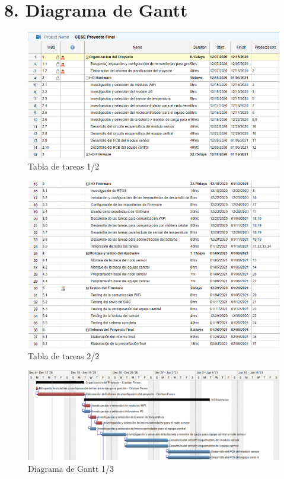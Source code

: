 \documentclass[11pt]{charter}
\begin{document}
\section{8. Diagrama de Gantt}
\label{sec:gantt}

\vspace{10px}

\begin{figure}[H]
\centering 
\includegraphics[width=.7\textwidth]{./Figuras/gantt-table1.png}
\caption{Tabla de tareas 1/2}
\label{fig:diagGantt}
\end{figure}

\vspace{10px}

\begin{figure}[H]
\centering 
\includegraphics[width=.7\textwidth]{./Figuras/gantt-table2.png}
\caption{Tabla de tareas 2/2}
\label{fig:diagGantt}
\end{figure}

\vspace{10px}

\begin{figure}[H]
\centering 
\includegraphics[width=.7\textwidth]{./Figuras/gant1.png}
\caption{Diagrama de Gantt 1/3}
\label{fig:diagGantt}
\end{figure}
\end{document}
